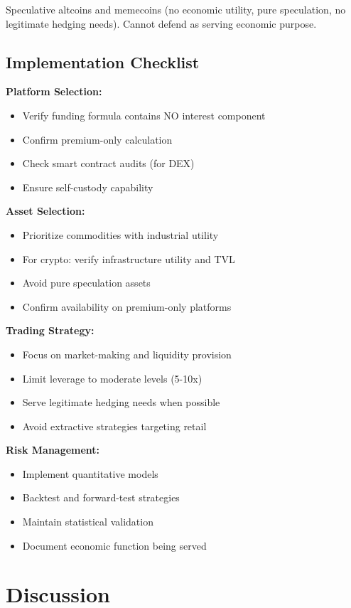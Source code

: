 \documentclass[10pt,twocolumn]{article}
\begin{document}
Speculative altcoins and memecoins (no economic utility, pure speculation, no legitimate hedging needs). Cannot defend as serving economic purpose.

\subsection{Implementation Checklist}

\textbf{Platform Selection:}
\begin{itemize}
    \item Verify funding formula contains NO interest component
    \item Confirm premium-only calculation
    \item Check smart contract audits (for DEX)
    \item Ensure self-custody capability
\end{itemize}

\textbf{Asset Selection:}
\begin{itemize}
    \item Prioritize commodities with industrial utility
    \item For crypto: verify infrastructure utility and TVL
    \item Avoid pure speculation assets
    \item Confirm availability on premium-only platforms
\end{itemize}

\textbf{Trading Strategy:}
\begin{itemize}
    \item Focus on market-making and liquidity provision
    \item Limit leverage to moderate levels (5-10x)
    \item Serve legitimate hedging needs when possible
    \item Avoid extractive strategies targeting retail
\end{itemize}

\textbf{Risk Management:}
\begin{itemize}
    \item Implement quantitative models
    \item Backtest and forward-test strategies
    \item Maintain statistical validation
    \item Document economic function being served
\end{itemize}

\section{Discussion}
\end{document}
